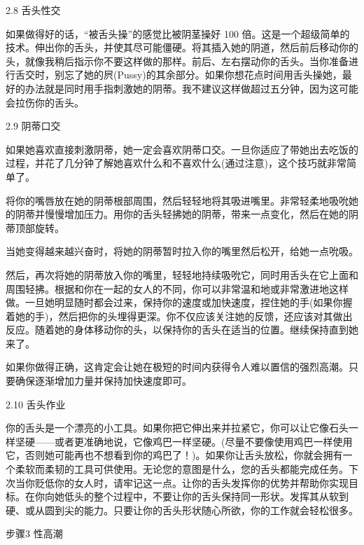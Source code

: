\documentclass[12pt,UTF8]{ctexbook}
\begin{document}
2.8 舌头性交




如果做得好的话，“被舌头操”的感觉比被阴茎操好 100 倍。这是一个超级简单的技术。伸出你的舌头，并使其尽可能僵硬。将其插入她的阴道，然后前后移动你的头，就像我稍后指示你不要这样做的那样。前后、左右摆动你的舌头。当你准备进行舌交时，别忘了她的屄(Pussy)的其余部分。如果你想花点时间用舌头操她，最好的办法就是同时用手指刺激她的阴蒂。我不建议这样做超过五分钟，因为这可能会拉伤你的舌头。





2.9 阴蒂口交




如果她喜欢直接刺激阴蒂，她一定会喜欢阴蒂口交。一旦你适应了带她出去吃饭的过程，并花了几分钟了解她喜欢什么和不喜欢什么(通过注意)，这个技巧就非常简单了。

将你的嘴唇放在她的阴蒂根部周围，然后轻轻地将其吸进嘴里。非常轻柔地吸吮她的阴蒂并慢慢增加压力。用你的舌头轻拂她的阴蒂，带来一点变化，然后在她的阴蒂顶部旋转。

当她变得越来越兴奋时，将她的阴蒂暂时拉入你的嘴里然后松开，给她一点吮吸。

然后，再次将她的阴蒂放入你的嘴里，轻轻地持续吸吮它，同时用舌头在它上面和周围轻拂。根据和你在一起的女人的不同，你可以非常温和地或非常激进地这样做。一旦她明显随时都会过来，保持你的速度或加快速度，捏住她的手(如果你握着她的手)，然后把你的头埋得更深。你不仅应该关注她的反馈，还应该对其做出反应。随着她的身体移动你的头，以保持你的舌头在适当的位置。继续保持直到她来了。

如果你做得正确，这肯定会让她在极短的时间内获得令人难以置信的强烈高潮。只要确保逐渐增加力量并保持加快速度即可。





2.10 舌头作业




你的舌头是一个漂亮的小工具。如果你把它伸出来并拉紧它，你可以让它像石头一样坚硬——或者更准确地说，它像鸡巴一样坚硬。(尽量不要像使用鸡巴一样使用它，否则她可能再也不想看到你的鸡巴了！)。如果你让舌头放松，你就会拥有一个柔软而柔韧的工具可供使用。无论您的意图是什么，您的舌头都能完成任务。下次当你贬低你的女人时，请牢记这一点。让你的舌头发挥你的优势并帮助你实现目标。在你向她低头的整个过程中，不要让你的舌头保持同一形状。发挥其从软到硬、或从圆到尖的能力。只要让你的舌头形状随心所欲，你的工作就会轻松很多。





步骤3 性高潮
\end{document}
